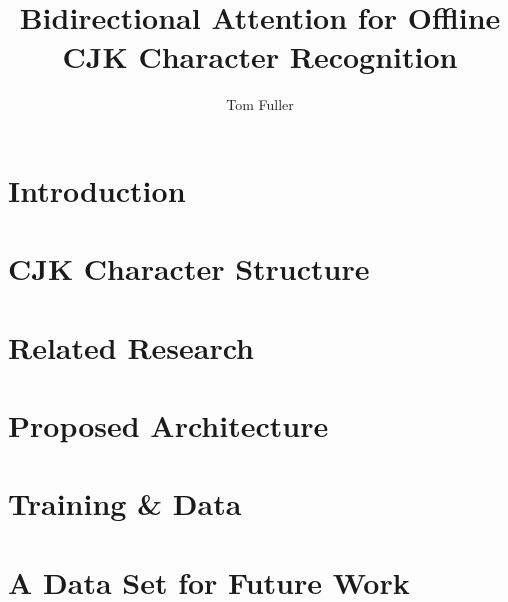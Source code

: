 \documentclass[10pt,letterpaper]{article}
\title{Bidirectional Attention for Offline CJK Character Recognition}
\author{Tom Fuller}
\begin{document}
\maketitle

\section{Introduction}


\section{CJK Character Structure}


\section{Related Research}


\section{Proposed Architecture}


\section{Training \& Data}


\section{A Data Set for Future Work}


\newpage


\listoffigures
\end{document}

